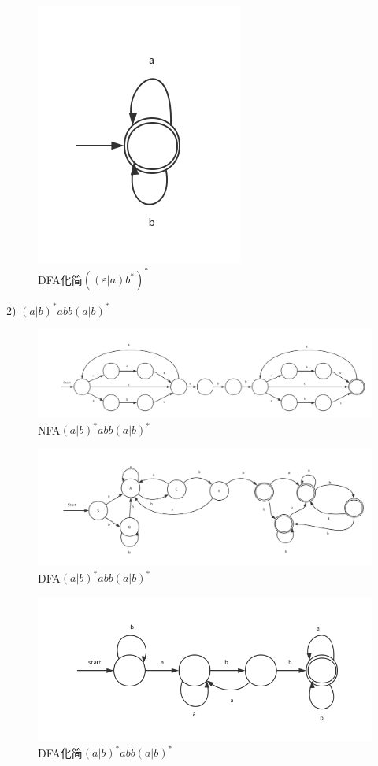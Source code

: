\documentclass[a4paper, 16pt]{article}
\begin{document}
\begin{figure}[H]
\centering
\includegraphics[scale = 0.6]{chapter3_hw2_7}
\caption{DFA化简$((\varepsilon|a)b^*)^*$}
\label{f1}
\end{figure}

2) $(a|b)^*abb(a|b)^*$\\
\begin{figure}[H]
\centering
\includegraphics[scale = 0.3]{chapter3_hw2_5}
\caption{NFA$(a|b)^*abb(a|b)^*$}
\label{f1}
\end{figure}

\begin{figure}[H]
\centering
\includegraphics[scale = 0.4]{chapter3_hw2_6}
\caption{DFA$(a|b)^*abb(a|b)^*$}
\label{f1}
\end{figure}


\begin{figure}[H]
\centering
\includegraphics[scale = 0.5]{chapter3_hw2_8}
\caption{DFA化简$(a|b)^*abb(a|b)^*$}
\label{f1}
\end{figure}
\end{document}
